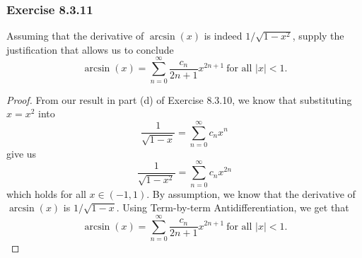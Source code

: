 \subsubsection{Exercise 8.3.11} Assuming that the derivative of \( \arcsin(x)  \) is indeed \( 1 / \sqrt{ 1 - x^{2} }  \), supply the justification that allows us to conclude 
\[  \arcsin(x) = \sum_{ n=0 }^{ \infty  } \frac{ c_{n}  }{  2n+1  } x^{2n+1} \ \text{for all }  | x  | < 1. \tag{5} \]
\begin{proof}
From our result in part (d) of Exercise 8.3.10, we know that substituting \( x  = x^{2} \) into 
\[  \frac{ 1 }{ \sqrt{ 1 - x  }  }  = \sum_{ n=0 }^{ \infty  } c_{n} x^{n}   \] give us 
\[  \frac{ 1  }{ \sqrt{ 1 -x^{2} }  } = \sum_{ n=0  }^{ \infty  } c_{n} x^{2n} \] which holds for all \( x \in (-1,1)\). By assumption, we know that the derivative of \( \arcsin(x)  \) is \( 1 / \sqrt{ 1 - x  }  \). Using Term-by-term Antidifferentiation, we get that 
\[  \arcsin(x) = \sum_{ n=0 }^{ \infty  } \frac{ c_{n}  }{ 2n+1  } x^{2n+1} \ \text{for all } |  x  | < 1.\]
\end{proof}

